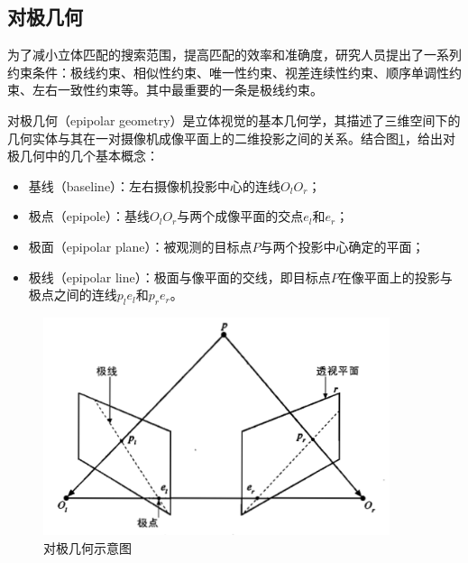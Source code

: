 \subsection{对极几何}

为了减小立体匹配的搜索范围，提高匹配的效率和准确度，研究人员提出了一系列约束条件：极线约束、相似性约束、唯一性约束、视差连续性约束、顺序单调性约束、左右一致性约束等\cite{陈拓2017CCNN}。其中最重要的一条是极线约束。

对极几何（epipolar geometry）是立体视觉的基本几何学，其描述了三维空间下的几何实体与其在一对摄像机成像平面上的二维投影之间的关系\cite{kowalczuk2015robust}。结合图\ref{fig:2_3_epipolar_geometry}，给出对极几何中的几个基本概念：

\begin{itemize}
	\item 基线（baseline）：左右摄像机投影中心的连线$O_lO_r$；
	\item 极点（epipole）：基线$O_lO_r$与两个成像平面的交点$e_l$和$e_r$；
	\item 极面（epipolar plane）：被观测的目标点$P$与两个投影中心确定的平面；
	\item 极线（epipolar line）：极面与像平面的交线，即目标点$P$在像平面上的投影与极点之间的连线$p_l e_l$和$p_r e_r$。
\end{itemize}

\begin{figure}[!htb] %
	\centering
	\includegraphics[width=4in]{figures/2_3_epipolar_geometry}
	\caption{对极几何示意图}\label{fig:2_3_epipolar_geometry}
\end{figure}

